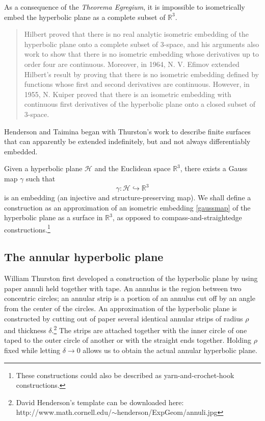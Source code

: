 \documentclass[letterpaper,titlepage]{article}
\newcommand{\esp}{$\mathbb{R}^3$}
\begin{document}
As a consequence of the \emph{Theorema Egregium}, it is impossible to isometrically embed the hyperbolic plane as a complete subset of \esp.\cite{gauss}
\begin{quote}
Hilbert proved that there is no real analytic isometric
embedding of the hyperbolic plane onto a complete
subset of 3-space, and his arguments also work to show
that there is no isometric embedding whose derivatives up
to order four are continuous. Moreover, in 1964, N. V.
Efimov extended Hilbert's result by proving that there is no
isometric embedding defined by functions whose first and
second derivatives are continuous. However, in 1955, N.
Kuiper proved that there is an isometric embedding with
continuous first derivatives of the hyperbolic plane onto a
closed subset of 3-space.\cite{crochetplane}
\end{quote}
Henderson and Taimina began with Thurston's work\cite{thurston} to describe finite surfaces that can apparently be extended indefinitely, but and not always differentiably embedded.
 
Given a hyperbolic plane $\mathcal{H}$ and the Euclidean space \esp, there exists a Gauss map $\gamma$ such that
\begin{equation}
\gamma : \mathcal{H} \hookrightarrow \mathbb{R}^3
\label{gaussmap}
\end{equation}
is an embedding (an injective and structure-preserving map).
We shall define a construction as an approximation of an isometric embedding \eqref{gaussmap} of the hyperbolic plane as a surface in \esp \cite{crochetplane}, as opposed to compass-and-straightedge constructions.\footnote{These constructions could also be described as yarn-and-crochet-hook constructions.}

\subsection{The annular hyperbolic plane}
William Thurston first developed a construction of the hyperbolic plane by using paper annuli held together with tape.\cite{thurston}
An annulus is the region between two concentric circles; an annular strip is a portion of an annulus cut off by an angle from the center of the circles.\cite{crochetplane}
An approximation of the hyperbolic plane is constructed by cutting out of paper several identical annular strips of radius $\rho$ and thickness $\delta$.\footnote{David Henderson's template can be downloaded here: http://www.math.cornell.edu/$\sim$henderson/ExpGeom/annuli.jpg}
The strips are attached together with the inner circle of one taped to the outer circle of another or with the straight ends together.
Holding $\rho$ fixed while letting $\delta \to 0$ allows us to obtain the actual annular hyperbolic plane.\cite{crochetplane}\cite{adventures}
\end{document}
